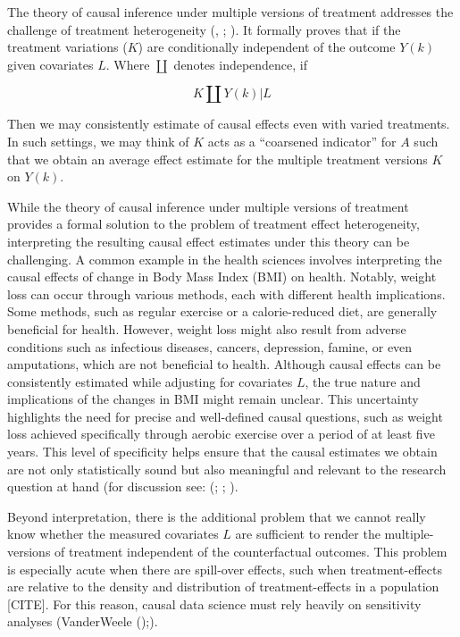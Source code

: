 \documentclass[
  singlecolumn,
  9pt]{article}
\begin{document}
The theory of causal inference under multiple versions of treatment
addresses the challenge of treatment heterogeneity
(,
;
). It
formally proves that if the treatment variations (\(K\)) are
conditionally independent of the outcome \(Y(k)\) given covariates
\(L\). Where \(\coprod\) denotes independence, if

\[
K \coprod Y(k) | L
\]

Then we may consistently estimate of causal effects even with varied
treatments. In such settings, we may think of \(K\) acts as a
``coarsened indicator'' for \(A\) such that we obtain an average effect
estimate for the multiple treatment versions \(K\) on \(Y(k)\).

While the theory of causal inference under multiple versions of
treatment provides a formal solution to the problem of treatment effect
heterogeneity, interpreting the resulting causal effect estimates under
this theory can be challenging. A common example in the health sciences
involves interpreting the causal effects of change in Body Mass Index
(BMI) on health. Notably, weight loss can occur through various methods,
each with different health implications. Some methods, such as regular
exercise or a calorie-reduced diet, are generally beneficial for health.
However, weight loss might also result from adverse conditions such as
infectious diseases, cancers, depression, famine, or even amputations,
which are not beneficial to health. Although causal effects can be
consistently estimated while adjusting for covariates \(L\), the true
nature and implications of the changes in BMI might remain unclear. This
uncertainty highlights the need for precise and well-defined causal
questions, such as weight loss achieved specifically through aerobic
exercise over a period of at least five years. This level of specificity
helps ensure that the causal estimates we obtain are not only
statistically sound but also meaningful and relevant to the research
question at hand (for discussion see:
(;
;
).

Beyond interpretation, there is the additional problem that we cannot
really know whether the measured covariates \(L\) are sufficient to
render the multiple-versions of treatment independent of the
counterfactual outcomes. This problem is especially acute when there are
spill-over effects, such when treatment-effects are relative to the
density and distribution of treatment-effects in a population
{[}CITE{]}. For this reason, causal data science must rely heavily on
sensitivity analyses (VanderWeele
();).
\end{document}
